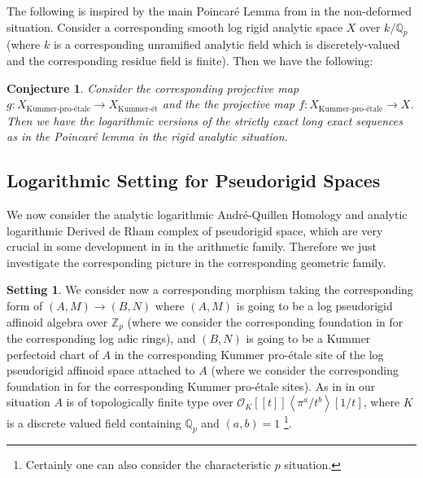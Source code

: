\documentclass[11pt]{book}
\newtheorem{conjecture}[theorem]{Conjecture}
\theoremstyle{definition}
\numberwithin{equation}{section}
\newtheorem{setting}[theorem]{Setting}
\begin{document}
\indent The following is inspired by the main Poincar\'e Lemma from \cite[Theorem 1.2]{12GL} in the non-deformed situation. Consider a corresponding smooth log rigid analytic space $X$ over $k/\mathbb{Q}_p$ (where $k$ is a corresponding unramified analytic field which is discretely-valued and the corresponding residue field is finite). Then we have the following:

\begin{conjecture}
Consider the corresponding projective map $g:X_{\text{Kummer-pro-\'etale}}\rightarrow X_{\text{Kummer-\'et}}$ and the the projective map $f:X_{\text{Kummer-pro-\'etale}}\rightarrow X$. Then we have the logarithmic versions of the strictly exact long exact sequences as in the Poincar\'e lemma in the rigid analytic situation. 
\end{conjecture}














\newpage

\subsection{Logarithmic Setting for Pseudorigid Spaces}


\indent We now consider the analytic logarithmic Andr\'e-Quillen Homology and analytic logarithmic Derived de Rham complex of pseudorigid space, which are very crucial in some development in \cite{12Bel1} in the arithmetic family. Therefore we just investigate the corresponding picture in the corresponding geometric family. 


\begin{setting}
We consider now a corresponding morphism taking the corresponding form of $(A,M)\rightarrow (B,N)$ where $(A,M)$ is going to be a log pseudorigid affinoid algebra over $\mathbb{Z}_p$ (where we consider the corresponding foundation in \cite[Chapter 2]{12DLLZ1} for the corresponding log adic rings), and $(B,N)$ is going to be a Kummer perfectoid chart of $A$ in the corresponding Kummer pro-\'etale site of the log pseudorigid affinoid space attached to $A$ (where we consider the corresponding foundation in \cite[Chapter 5]{12DLLZ1} for the corresponding Kummer pro-\'etale sites). As in \cite[Definition 3.1, and below Definition 3.1]{12Bel1} in our situation $A$ is of topologically finite type over $\mathcal{O}_K[[t]]\left<\pi^a/t^b\right>[1/t]$, where $K$ is a discrete valued field containing $\mathbb{Q}_p$ and $(a,b)=1$ \footnote{Certainly one can also consider the characteristic $p$ situation.}.	
\end{setting}
\end{document}
